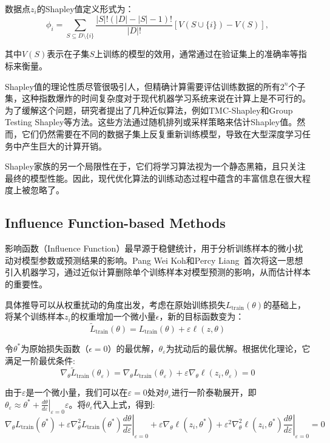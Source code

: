 数据点$z_i$的Shapley值定义形式为：
\begin{equation}
\phi_i =\sum_{S \subseteq D\setminus\{i\}}\frac{|S|!(|D|-|S|-1)!}{|D|!}\left[V(S\cup\{i\})-V(S)\right],
\end{equation}

其中$V(S)$表示在子集$S$上训练的模型的效用，通常通过在验证集上的准确率等指标来衡量。

Shapley值的理论性质尽管很吸引人，但精确计算需要评估训练数据的所有$2^n$个子集，这种指数爆炸的时间复杂度对于现代机器学习系统来说在计算上是不可行的。为了缓解这个问题，研究者提出了几种近似算法，例如TMC-Shapley和Group Testing Shapley等方法\cite{jia2019towards}。这些方法通过随机排列或采样策略来估计Shapley值。然而，它们仍然需要在不同的数据子集上反复重新训练模型，导致在大型深度学习任务中产生巨大的计算开销。

Shapley家族的另一个局限性在于，它们将学习算法视为一个静态黑箱，且只关注最终的模型性能。因此，现代优化算法的训练动态过程中蕴含的丰富信息在很大程度上被忽略了。

\subsection{Influence Function-based Methods}
影响函数（Influence Function）最早源于稳健统计，用于分析训练样本的微小扰动对模型参数或预测结果的影响。Pang Wei Koh和Percy Liang~\cite{influence}首次将这一思想引入机器学习，通过近似计算删除单个训练样本对模型预测的影响，从而估计样本的重要性。

具体推导可以从权重扰动的角度出发，考虑在原始训练损失\(L_{\mathrm{train}}(\theta)\)的基础上，将某个训练样本$z_i$的权重增加一个微小量$\epsilon$，新的目标函数变为：
\begin{equation}
\tilde{L}_{\mathrm{train}}(\theta) = L_{\mathrm{train}}(\theta) + \varepsilon \ell(z,\theta)
\end{equation}

令\(\theta^{*}\)为原始损失函数（$\epsilon=0$）的最优解，\(\theta_{\varepsilon}\)为扰动后的最优解。根据优化理论，它满足一阶最优条件:
\begin{equation}
\nabla_{\theta} \tilde{L}_{\mathrm{train}}(\theta_{\varepsilon}) = \nabla_{\theta} L_{\mathrm{train}}(\theta_{\varepsilon}) + \varepsilon \nabla_{\theta} \ell(z_i, \theta_{\varepsilon}) = 0
\end{equation}

由于\(\varepsilon\)是一个微小量，我们可以在\(\varepsilon=0\)处对\(\theta_{\varepsilon}\)进行一阶泰勒展开，即$\theta_{\varepsilon} \approx \theta^{*} + \left.\frac{d\theta}{d\varepsilon}\right|_{\varepsilon=0}\varepsilon$。将\(\theta_{\varepsilon}\)代入上式，得到:
\begin{equation}
\nabla_{\theta} L_{\mathrm{train}}(\theta^{*}) + \varepsilon\nabla_{\theta}^2 L_{\mathrm{train}}(\theta^{*})\left.\frac{d\theta}{d\varepsilon}\right|_{\varepsilon=0} + \varepsilon \nabla_{\theta} \ell(z_i, \theta^{*}) + \varepsilon^2\nabla_{\theta}^2 \ell(z_i, \theta^{*})\left.\frac{d\theta}{d\varepsilon}\right|_{\varepsilon=0}= 0
\end{equation}

